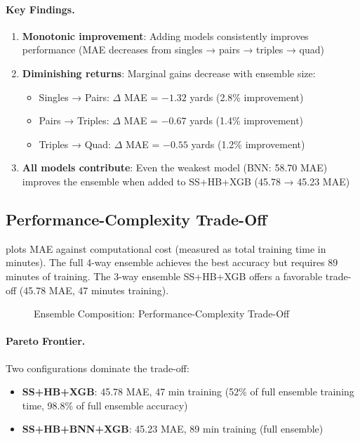 \paragraph{Key Findings.}
\begin{enumerate}
  \item \textbf{Monotonic improvement}: Adding models consistently improves performance (MAE decreases from singles → pairs → triples → quad)
  \item \textbf{Diminishing returns}: Marginal gains decrease with ensemble size:
    \begin{itemize}
      \item Singles → Pairs: $\Delta$ MAE = $-1.32$ yards (2.8\% improvement)
      \item Pairs → Triples: $\Delta$ MAE = $-0.67$ yards (1.4\% improvement)
      \item Triples → Quad: $\Delta$ MAE = $-0.55$ yards (1.2\% improvement)
    \end{itemize}
  \item \textbf{All models contribute}: Even the weakest model (BNN: 58.70 MAE) improves the ensemble when added to SS+HB+XGB (45.78 → 45.23 MAE)
\end{enumerate}

\subsection{Performance-Complexity Trade-Off}

 plots MAE against computational cost (measured as total training time in minutes). The full 4-way ensemble achieves the best accuracy but requires 89 minutes of training. The 3-way ensemble SS+HB+XGB offers a favorable trade-off (45.78 MAE, 47 minutes training).

\begin{figure}[htbp]
  \centering
  \caption{Ensemble Composition: Performance-Complexity Trade-Off}
  \label{fig:ensemble-complexity-tradeoff}
\end{figure}

\paragraph{Pareto Frontier.}
Two configurations dominate the trade-off:
\begin{itemize}
  \item \textbf{SS+HB+XGB}: 45.78 MAE, 47 min training (52\% of full ensemble training time, 98.8\% of full ensemble accuracy)
  \item \textbf{SS+HB+BNN+XGB}: 45.23 MAE, 89 min training (full ensemble)
\end{itemize}

